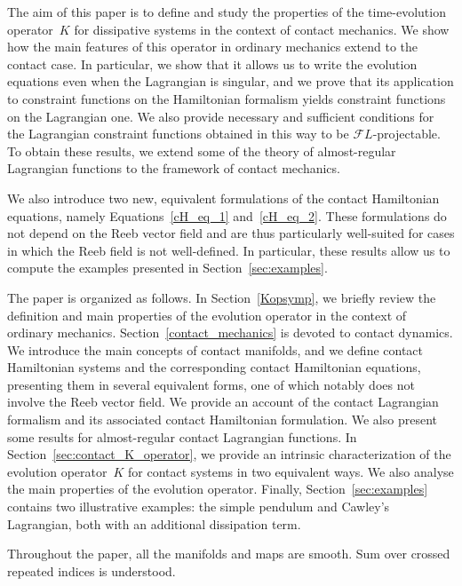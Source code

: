 \documentclass[11pt]{article}
\theoremstyle{plain}
\theoremstyle{definition}
\def\FL{\mathcal{F} L}
\begin{document}
The aim of this paper is 
to define and study the properties of the time-evolution operator~$K$
for dissipative systems in the context of contact mechanics.
We show how the main features of this operator
in ordinary mechanics extend to the contact case.
In particular, we show that 
it allows us to write the evolution equations even when the Lagrangian is singular,
and we prove that its application to constraint functions on the Hamiltonian formalism yields constraint functions on the Lagrangian one.
We also provide necessary and sufficient conditions for the Lagrangian constraint functions obtained in this way to be $\FL$-projectable.
To obtain these results, 
we extend some of the theory of almost-regular Lagrangian functions to the framework of contact mechanics.

We also introduce two new, equivalent formulations of the contact Hamiltonian equations, 
namely Equations~\eqref{cH_eq_1} and~\eqref{cH_eq_2}. 
These formulations do not depend on the Reeb vector field 
and are thus particularly well-suited 
for cases in which the Reeb field is not well-defined. 
In particular, 
these results allow us to compute the examples presented in Section~\ref{sec:examples}.



The paper is organized as follows. 
In Section~\ref{Kopsymp}, we briefly review the definition and main properties of the evolution operator in the context of ordinary mechanics.
Section~\ref{contact_mechanics} is devoted to contact dynamics. We introduce the main concepts of contact manifolds, and we define contact Hamiltonian systems and the corresponding contact Hamiltonian equations, 
presenting them in several equivalent forms, one of which notably does not involve the Reeb vector field. 
We provide an account of the contact Lagrangian formalism and its associated contact Hamiltonian formulation.
We also present some results for almost-regular contact Lagrangian functions. 
In Section~\ref{sec:contact_K_operator}, we provide an intrinsic characterization of the evolution operator~$K$ for contact systems in two equivalent ways. 
We also analyse the main properties of the evolution operator.
Finally, Section~\ref{sec:examples} contains two illustrative examples:
the simple pendulum and Cawley's Lagrangian, 
both with an additional dissipation term. 


Throughout the paper, all the manifolds and maps are smooth.
Sum over crossed repeated indices is understood.
\end{document}
